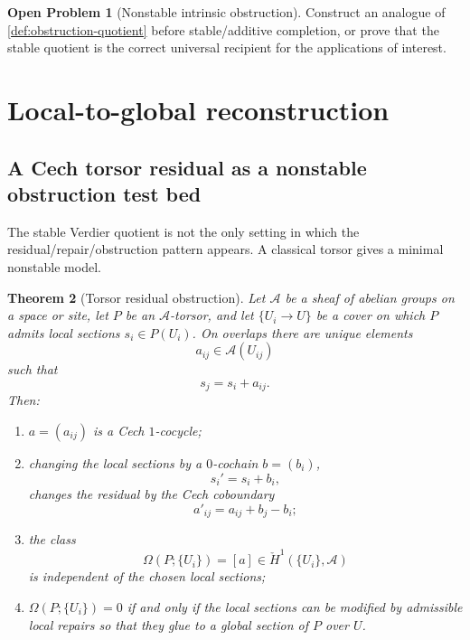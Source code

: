 \documentclass[11pt]{article}
\newtheorem{theorem}{Theorem}[section]
\theoremstyle{definition}
\newtheorem{problem}[theorem]{Open Problem}
\theoremstyle{remark}
\begin{document}
\begin{problem}[Nonstable intrinsic obstruction]
Construct an analogue of \cref{def:obstruction-quotient} before stable/additive completion, or prove that the stable quotient is the correct universal recipient for the applications of interest.
\end{problem}

\section{Local-to-global reconstruction}

\subsection{A Cech torsor residual as a nonstable obstruction test bed}

The stable Verdier quotient is not the only setting in which the residual/repair/obstruction pattern appears. A classical torsor gives a minimal nonstable model.

\begin{theorem}[Torsor residual obstruction]\label{thm:torsor-obstruction}
Let $\mathcal A$ be a sheaf of abelian groups on a space or site, let $P$ be an $\mathcal A$-torsor, and let $\{U_i\to U\}$ be a cover on which $P$ admits local sections $s_i\in P(U_i)$. On overlaps there are unique elements
\[
a_{ij}\in\mathcal A(U_{ij})
\]
such that
\[
s_j=s_i+a_{ij}.
\]
Then:
\begin{enumerate}
    \item $a=(a_{ij})$ is a Cech $1$-cocycle;
    \item changing the local sections by a $0$-cochain $b=(b_i)$,
    \[
    s_i'=s_i+b_i,
    \]
    changes the residual by the Cech coboundary
    \[
    a'_{ij}=a_{ij}+b_j-b_i;
    \]
    \item the class
    \[
    \Omega(P;\{U_i\})=[a]\in\check H^1(\{U_i\},\mathcal A)
    \]
    is independent of the chosen local sections;
    \item $\Omega(P;\{U_i\})=0$ if and only if the local sections can be modified by admissible local repairs so that they glue to a global section of $P$ over $U$.
\end{enumerate}
\end{theorem}
\end{document}
